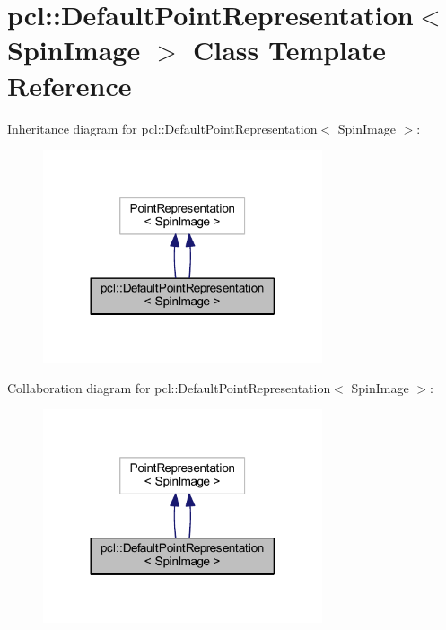 \hypertarget{classpcl_1_1_default_point_representation_3_01_spin_image_01_4}{}\section{pcl\+:\+:Default\+Point\+Representation$<$ Spin\+Image $>$ Class Template Reference}
\label{classpcl_1_1_default_point_representation_3_01_spin_image_01_4}


Inheritance diagram for pcl\+:\+:Default\+Point\+Representation$<$ Spin\+Image $>$\+:
\nopagebreak
\begin{figure}[H]
\begin{center}
\leavevmode
\includegraphics[width=233pt]{classpcl_1_1_default_point_representation_3_01_spin_image_01_4__inherit__graph}
\end{center}
\end{figure}


Collaboration diagram for pcl\+:\+:Default\+Point\+Representation$<$ Spin\+Image $>$\+:
\nopagebreak
\begin{figure}[H]
\begin{center}
\leavevmode
\includegraphics[width=233pt]{classpcl_1_1_default_point_representation_3_01_spin_image_01_4__coll__graph}
\end{center}
\end{figure}
